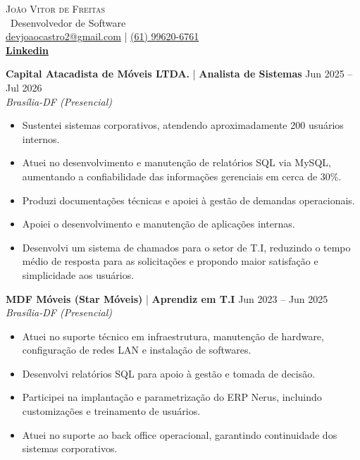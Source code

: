 


    \vspace*{-40pt}

    \vspace*{-2pt}
    \begin{center}
        {\Huge \scshape {João Vitor de Freitas}}\\
        \vspace*{2pt}
        \ {Desenvolvedor de Software}\\
        \vspace*{2pt}
        \href{mailto:devjoaocastro2@gmail.com}{devjoaocastro2@gmail.com} | \href{tel:+5561996206761}{(61) 99620-6761}\\
        \vspace*{4pt}
        \textbf{\href{https://www.linkedin.com/in/joao-castro2/}{Linkedin}}\\
    \end{center}

    \vspace{2mm}

\textbf{Capital Atacadista de Móveis LTDA.} | \textbf{Analista de Sistemas} \hfill Jun 2025 – Jul 2026\\
\textit{Brasília-DF (Presencial)}
\vspace{-3mm}
\begin{itemize} \itemsep -3pt
    \item Sustentei sistemas corporativos, atendendo aproximadamente 200 usuários internos.
    \item Atuei no desenvolvimento e manutenção de relatórios SQL via MySQL, aumentando a confiabilidade das informações gerenciais em cerca de 30\%.
    \item Produzi documentações técnicas e apoiei à gestão de demandas operacionais.
    \item Apoiei o desenvolvimento e manutenção de aplicações internas.
    \item Desenvolvi um sistema de chamados para o setor de T.I, reduzindo o tempo médio de resposta para as solicitações e propondo maior satisfação e simplicidade aos usuários.
\end{itemize}

\textbf{MDF Móveis (Star Móveis)} | \textbf{Aprendiz em T.I} \hfill Jun 2023 – Jun 2025\\
\textit{Brasília-DF (Presencial)}
\vspace{-3mm}
\begin{itemize} \itemsep -3pt
    \item Atuei no suporte técnico em infraestrutura, manutenção de hardware, configuração de redes LAN e instalação de softwares.
    \item Desenvolvi relatórios SQL para apoio à gestão e tomada de decisão.
    \item Participei na implantação e parametrização do ERP Nerus, incluindo customizações e treinamento de usuários.
    \item Atuei no suporte ao back office operacional, garantindo continuidade dos sistemas corporativos.
\end{itemize}

